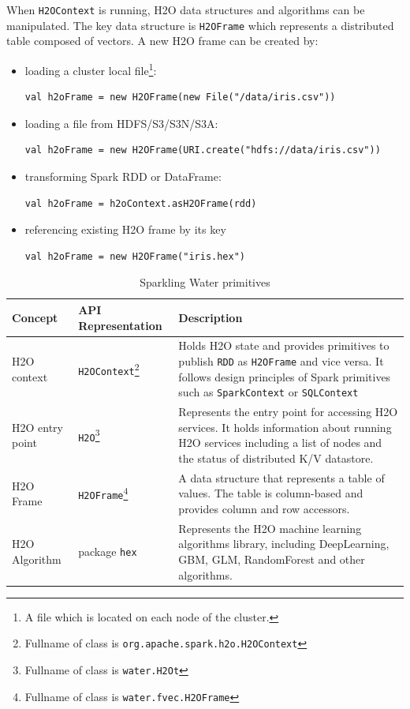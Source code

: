 When \texttt{H2OContext} is running, H2O data structures and algorithms can be manipulated. The key data structure is \texttt{H2OFrame} which represents a distributed table composed of vectors. A new H2O frame can be created by:
\begin{itemize}
	\item loading a cluster local file\footnote{A file which is located on each node of the cluster.}:
\begin{lstlisting}[style=Scala]
val h2oFrame = new H2OFrame(new File("/data/iris.csv"))
\end{lstlisting}
	\item loading a file from HDFS/S3/S3N/S3A:
\begin{lstlisting}[style=Scala]
val h2oFrame = new H2OFrame(URI.create("hdfs://data/iris.csv"))
\end{lstlisting}
	\item transforming Spark RDD or DataFrame:
\begin{lstlisting}[style=Scala]
val h2oFrame = h2oContext.asH2OFrame(rdd)
\end{lstlisting}
	\item referencing existing H2O frame by its key
\begin{lstlisting}[style=Scala]
val h2oFrame = new H2OFrame("iris.hex")
\end{lstlisting}		
\end{itemize}


\begin{table}
\centering
\begin{tabularx}{\textwidth}{l l p{5.2cm}}
\toprule
Concept & API Representation & Description \\
\midrule
H2O context & \texttt{H2OContext}\footnote{Fullname of class is \texttt{org.apache.spark.h2o.H2OContext}} & Holds
H2O state and provides primitives to publish \texttt{RDD} as \texttt{H2OFrame} and
vice versa. It follows design principles of Spark primitives such as
\texttt{SparkContext} or \texttt{SQLContext} \\  \addlinespace

H2O entry point & \texttt{H2O}\footnote{Fullname of class is \texttt{water.H2Ot}} & Represents the entry point for accessing
H2O services. It holds information about running H2O services including a list of
nodes and the status of distributed K/V datastore. \\  \addlinespace

H2O Frame & \texttt{H2OFrame}\footnote{Fullname of class is \texttt{water.fvec.H2OFrame}} & A data structure that
represents a table of values. The table is column-based and provides column and
row accessors. \\  \addlinespace

H2O Algorithm & package \texttt{hex} & Represents the H2O machine learning
algorithms library, including DeepLearning, GBM, GLM, RandomForest and other
algorithms. \\

\bottomrule
\end{tabularx}
\caption{Sparkling Water primitives}
\label{tab:primitives}
\end{table}

